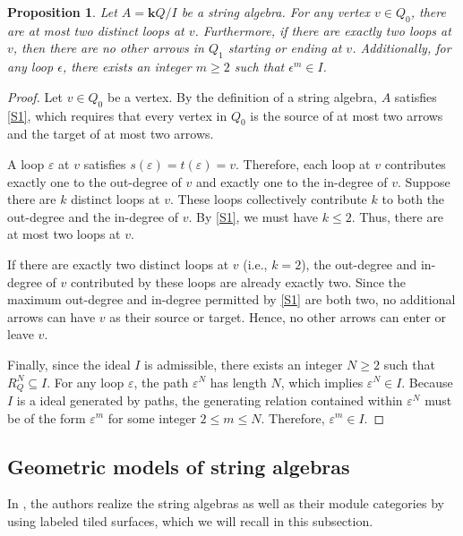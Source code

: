 \documentclass[11pt]{amsart}
\numberwithin{equation}{section}
\newtheorem{proposition}[theorem]{Proposition}
\theoremstyle{definition}
\begin{document}
\begin{proposition}\label{pro:string_loops}
    Let $A = \mathbf{k}Q/I$ be a string algebra. For any vertex $v \in Q_0$, there are at most two distinct loops at $v$. Furthermore, if there are exactly two loops at $v$, then there are no other arrows in $Q_1$ starting or ending at $v$. Additionally, for any loop $\epsilon$, there exists an integer $m \ge 2$ such that $\epsilon^m \in I$.
\end{proposition}
\begin{proof}
Let $v \in Q_0$ be a vertex. By the definition of a string algebra, $A$ satisfies \ref{S1}, which requires that every vertex in $Q_0$ is the source of at most two arrows and the target of at most two arrows. 

A loop $\varepsilon$ at $v$ satisfies $s(\varepsilon) = t(\varepsilon) = v$. Therefore, each loop at $v$ contributes exactly one to the out-degree of $v$ and exactly one to the in-degree of $v$. Suppose there are $k$ distinct loops at $v$. These loops collectively contribute $k$ to both the out-degree and the in-degree of $v$. By  \ref{S1}, we must have $k \le 2$. Thus, there are at most two loops at $v$.

If there are exactly two distinct loops at $v$ (i.e., $k = 2$), the out-degree and in-degree of $v$ contributed by these loops are already exactly two. Since the maximum out-degree and in-degree permitted by \ref{S1} are both two, no additional arrows can have $v$ as their source or target. Hence, no other arrows can enter or leave $v$.

Finally, since the ideal $I$ is admissible, there exists an integer $N \ge 2$ such that $R_Q^N \subseteq I$. For any loop $\varepsilon$, the path $\varepsilon^N$ has length $N$, which implies $\varepsilon^N \in I$. Because $I$ is a  ideal generated by paths, the generating relation contained within $\varepsilon^N$ must be of the form $\varepsilon^m$ for some integer $2 \le m \le N$. Therefore, $\varepsilon^m \in I$.
\end{proof}






\subsection{Geometric models of string algebras }\label{subsection: geo-module categories}

In \cite{BC24}, the authors realize the string algebras as well as their module categories by using labeled tiled surfaces, which we will recall in this subsection.
\end{document}
